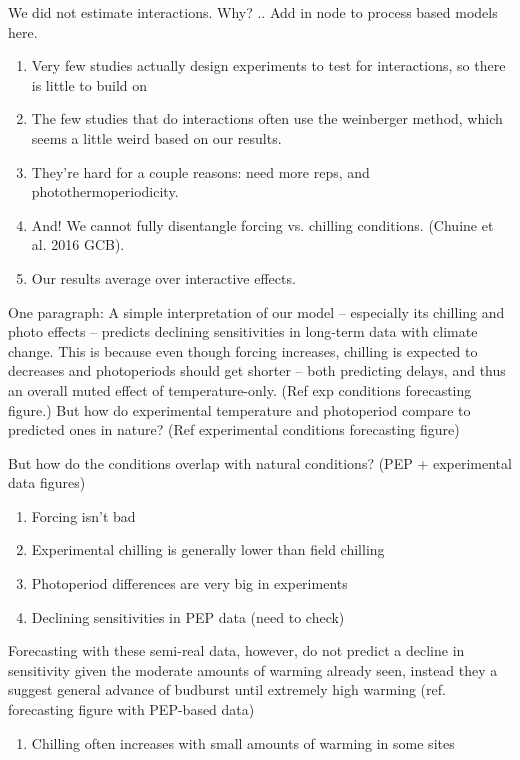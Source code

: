 \documentclass[11pt,letter]{article}
\begin{document}
{\begin{enumerate}
\end{enumerate}
\item We did not estimate interactions. Why? ..  Add in node to process based models here. 
\begin{enumerate}
\item Very few studies actually design experiments to test for interactions, so there is little to build on
\item The few studies that do interactions often use the weinberger method, which seems a little weird based on our results.
\item They're hard for a couple reasons: need more reps, and photothermoperiodicity.
\item And! We cannot fully disentangle forcing vs. chilling conditions. (Chuine et al. 2016 GCB).
\item Our results average over interactive effects. 
\end{enumerate}
\item One paragraph: A simple interpretation of our model -- especially its chilling and photo effects -- predicts declining sensitivities in long-term data with climate change. This is because even though forcing increases, chilling is expected to decreases and photoperiods should get shorter -- both predicting delays, and thus an overall muted effect of temperature-only.  (Ref exp conditions forecasting figure.) But how do experimental temperature and photoperiod compare to predicted ones in nature? (Ref experimental conditions forecasting figure)
\item But how do the conditions overlap with natural conditions? (PEP + experimental data figures)
\begin{enumerate}
\item Forcing isn't bad
\item Experimental chilling is generally lower than field chilling
\item Photoperiod differences are very big in experiments
\item Declining sensitivities in PEP data (need to check)
\end{enumerate}
\item Forecasting with these semi-real data, however, do not predict a decline in sensitivity given the moderate amounts of warming already seen, instead they a suggest general advance of budburst until extremely high warming (ref. forecasting figure with PEP-based data)
\begin{enumerate}
\item Chilling often increases with small amounts of warming in some sites

\end{enumerate}}
\end{document}

